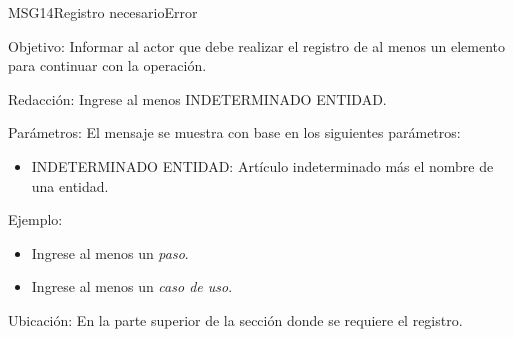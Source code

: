 \begin{mensaje}{MSG14}{Registro necesario}{Error}
	\item [Objetivo:] Informar al actor que debe realizar el registro de al menos un elemento para continuar con la operación.
	\item[Redacción:] Ingrese al menos INDETERMINADO ENTIDAD.
	\item[Parámetros:] El mensaje se muestra con base en los siguientes parámetros:
	\begin{itemize}
		\item INDETERMINADO ENTIDAD: Artículo indeterminado más el nombre de una entidad.
	\end{itemize}
	\item[Ejemplo:] \begin{itemize}
		\item Ingrese al menos un {\em paso}.
		\item Ingrese al menos un {\em caso de uso}.
	\end{itemize}
	\item [Ubicación:] En la parte superior de la sección donde se requiere el registro.
\end{mensaje}
